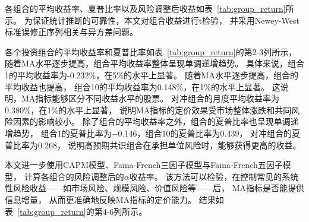 各组合的平均收益率、夏普比率以及风险调整后收益如表~\ref{tab:group_return}所示。
为保证统计推断的可靠性，本文对组合收益进行t检验，
并采用Newey-West标准误修正序列相关与异方差问题。

各个投资组合的平均收益率和夏普比率如表~\ref{tab:group_return}的第2-3列所示，
随着MA水平逐步提高，组合平均收益率整体呈现单调递增趋势。
具体来说，组合1的平均收益率为-0.232\%，在5\%的水平上显著。
随着MA水平逐步提高，组合的平均收益也提高，
组合10的平均收益率为0.148\%，在1\%的水平上显著。
这说明，MA指标能够区分不同收益水平的股票。
对冲组合的月度平均收益率为0.380\%，在1\%的水平上显著，
说明MA指标的定价效果受市场整体涨跌和共同风险因素的影响较小。
除了组合的平均收益率之外，组合的夏普比率也呈现单调递增趋势，
组合1的夏普比率为$-0.146$，组合10的夏普比率为$0.439$，
对冲组合的夏普比率为$0.268$，
说明高预期共识组合在承担单位风险时，能够获得更高的收益。

本文进一步使用CAPM模型、Fama-French三因子模型与Fama-French五因子模型，
计算各组合的风险调整后的$\alpha$收益率。
该方法可以检验，在控制常见的系统性风险收益——如市场风险、规模风险、价值风险等——后，
MA指标是否能提供信息增量，
从而更准确地反映MA指标的定价能力。
结果如表~\ref{tab:group_return}的第4-6列所示。

